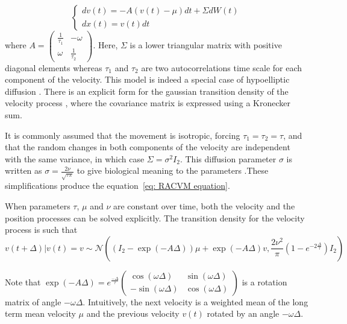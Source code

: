 \documentclass[11pt]{article}
\newcommand {\1}{\mathbb{1}}
\begin{document}
\begin{equation} \left\{
	\begin{array}{l}
		dv(t)=-A(v(t)-\mu)dt+\Sigma dW(t) \\
		dx(t)=v(t) dt
	\end{array}
	\right.
	\label{eq: general RACVM equation}
\end{equation}
where $A=\begin{pmatrix} 
	\frac{1}{\tau_1} & -\omega \\
	\omega & \frac{1}{\tau_2}
\end{pmatrix}$.
Here, $\Sigma$ is a lower triangular matrix with positive diagonal elements whereas $\tau_1$ and $\tau_2$ are two autocorrelations time scale for each component of the velocity. This model is indeed a special case of hypoelliptic diffusion \cite{ditlevsen_hypoelliptic_2018}.
There is an explicit form for the gaussian transition density of the velocity process \cite{albertsen_generalizing_2019}, where the covariance matrix is expressed using a Kronecker sum.

It is commonly assumed that the movement is isotropic, forcing $\tau_1=\tau_2=\tau$, and that the random changes in both components of the velocity are independent with the same variance, in which case $\Sigma=\sigma^2 I_2$.
This diffusion parameter $\sigma$ is written as $\sigma=\frac{2\nu}{\sqrt{\tau \pi}}$ to give biological meaning to the parameters \cite{gurarie_correlated_2017}.These simplifications produce the equation~\ref{eq: RACVM equation}.

When parameters $\tau$, $\mu$ and $\nu$ are constant over time, both the velocity and the position processes can be solved explicitly.
The transition density for the velocity process is such that 
\begin{equation}v(t+\Delta) \vert v(t)=v \sim \mathcal{N}\left( (I_2-\exp(-A\Delta))\mu + \exp(-A\Delta)v, \frac{2\nu^2}{\pi}(1-e^{-2\frac{\Delta}{\tau}}) I_2 \right) 
\end{equation}


Note that $\exp(-A\Delta)=e^{\frac{-\Delta}{\tau}} \begin{pmatrix} \cos(\omega \Delta) & \sin(\omega \Delta) \\ -\sin(\omega \Delta) & \cos(\omega \Delta) \end{pmatrix}$ is a rotation matrix of angle $-\omega \Delta$.
Intuitively, the next velocity is a weighted mean of the long term mean velocity $\mu$ and the previous velocity $v(t)$ rotated by an angle $-\omega \Delta$.
\end{document}
